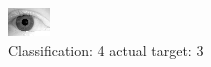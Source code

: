 \begin{figure}[h!]
\begin{center}
\includegraphics[width=0.60\columnwidth]{figures/ID2202_class_4_target_3.png}
\end{center}
\caption{ Classification: 4 actual target: 3}
\label{fig:ID2202_class_4_target_3}
\end{figure}
